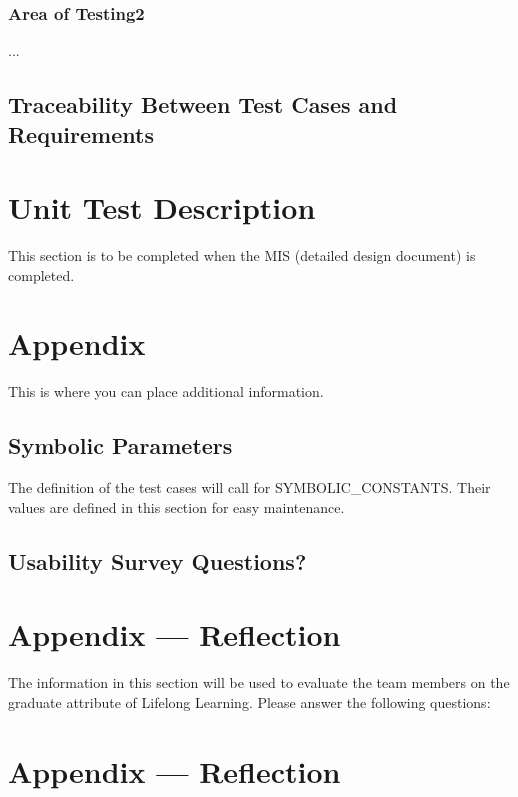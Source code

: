 \documentclass[12pt, titlepage]{article}
\begin{document}
\subsubsection{Area of Testing2}

...

\subsection{Traceability Between Test Cases and Requirements}


\section{Unit Test Description}

This section is to be completed when the MIS (detailed design document) is completed.

\section{Appendix}

This is where you can place additional information.

\subsection{Symbolic Parameters}

The definition of the test cases will call for SYMBOLIC\_CONSTANTS.
Their values are defined in this section for easy maintenance.

\subsection{Usability Survey Questions?}


\newpage{}
\section*{Appendix --- Reflection}

The information in this section will be used to evaluate the team members on the
graduate attribute of Lifelong Learning.  Please answer the following questions:

\newpage{}
\section*{Appendix --- Reflection}
\end{document}
